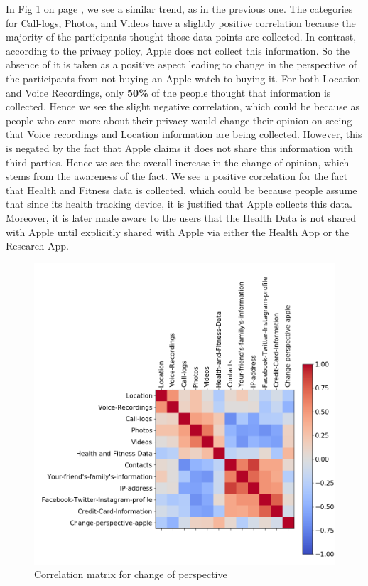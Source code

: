 \documentclass[sigconf]{acmart}
\begin{document}
In Fig \ref{fig:changeDos} on page \pageref{fig:changeDos}, we see a similar trend, as in the previous one. The categories for Call-logs, Photos, and Videos have a slightly positive correlation because the majority of the participants thought those data-points are collected. In contrast, according to the privacy policy, Apple does not collect this information. So the absence of it is taken as a positive aspect leading to change in the perspective of the participants from not buying an Apple watch to buying it. For both Location and Voice Recordings, only \textbf{50\%} of the people thought that information is collected. Hence we see the slight negative correlation, which could be because as people who care more about their privacy would change their opinion on seeing that Voice recordings and Location information are being collected. However, this is negated by the fact that Apple claims it does not share this information with third parties. Hence we see the overall increase in the change of opinion, which stems from the awareness of the fact. We see a positive correlation for the fact that Health and Fitness data is collected, which could be because people assume that since its health tracking device, it is justified that Apple collects this data. Moreover, it is later made aware to the users that the Health Data is not shared with Apple until explicitly shared with Apple via either the Health App or the Research App. 

\begin{figure}[h]
  \centering
  \includegraphics[width=\linewidth]{06-changePerspective-2.png}
  \caption{Correlation matrix for change of perspective}
  \label{fig:changeDos}
\end{figure}
\end{document}
